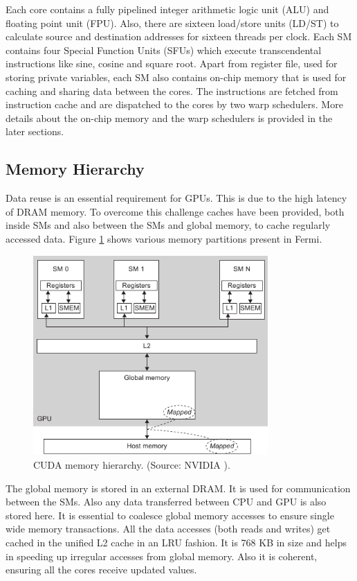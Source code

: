 Each core contains a fully pipelined integer arithmetic logic unit (ALU) and floating point unit (FPU). Also, there are sixteen load/store units (LD/ST) to calculate source and destination addresses for sixteen threads per clock. Each SM contains four Special Function Units (SFUs) which execute transcendental instructions like sine, cosine and square root. Apart from register file, used for storing private variables, each SM also contains on-chip memory that is used for caching and sharing data between the cores. The instructions are fetched from instruction cache and are dispatched to the cores by two warp schedulers. More details about the on-chip memory and the warp schedulers is provided in the later sections.

\subsection{Memory Hierarchy}

Data reuse is an essential requirement for GPUs. This is due to the high latency of DRAM memory. To overcome this challenge caches have been provided, both inside SMs and also between the SMs and global memory, to cache regularly accessed data. Figure \ref{fig:fermi:mem} shows various memory partitions present in Fermi.

\begin{figure}[h]
	\centerline{
   \includegraphics[width=0.8\textwidth]{./Data/nvidia/mem_fermi}  	
	}
	\caption{ CUDA memory hierarchy. (Source: NVIDIA \cite{farber}).}
\label{fig:fermi:mem}
\end{figure}

The global memory is stored in an external DRAM. It is used for communication between the SMs. Also any data transferred between CPU and GPU is also stored here. It is essential to coalesce global memory accesses to ensure single wide memory transactions. All the data accesses (both reads and writes) get cached in the unified L2 cache in an LRU fashion. It is 768 KB in size and helps in speeding up irregular accesses from global memory. Also it is coherent, ensuring all the cores receive updated values.

